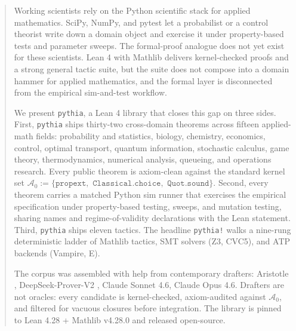 \begin{abstract}
Working scientists rely on the Python scientific stack for
applied mathematics. SciPy, NumPy, and pytest let a probabilist
or a control theorist write down a domain object and exercise it
under property-based tests and parameter sweeps. The formal-proof
analogue does not yet exist for these scientists. Lean 4 with
Mathlib delivers kernel-checked proofs and a strong general
tactic suite, but the suite does not compose into a domain
hammer for applied mathematics, and the formal layer is
disconnected from the empirical sim-and-test workflow.

We present \texttt{pythia}, a Lean 4 library that closes this
gap on three sides. First, \texttt{pythia} ships thirty-two
cross-domain theorems across fifteen applied-math fields:
probability and statistics, biology, chemistry, economics,
control, optimal transport, quantum information, stochastic
calculus, game theory, thermodynamics, numerical analysis,
queueing, and operations research. Every public theorem is
axiom-clean against the standard kernel set $\mathcal{A}_0 :=
\{\texttt{propext},$ $\texttt{Classical.choice},$
$\texttt{Quot.sound}\}$. Second, every theorem carries a matched
Python sim runner that exercises the empirical specification
under property-based testing, sweeps, and mutation testing,
sharing names and regime-of-validity declarations with the Lean
statement. Third, \texttt{pythia} ships eleven tactics. The
headline \texttt{pythia!} walks a nine-rung deterministic ladder
of Mathlib tactics, SMT solvers (Z3, CVC5), and ATP backends
(Vampire, E).

The corpus was assembled with help from contemporary drafters:
Aristotle \citep{harmonic2025aristotle}, DeepSeek-Prover-V2
\citep{deepseekprover2024v2}, Claude Sonnet 4.6, Claude Opus
4.6. Drafters are not oracles: every candidate is kernel-checked,
axiom-audited against $\mathcal{A}_0$, and filtered for vacuous
closures before integration. The library is pinned to Lean 4.28
+ Mathlib v4.28.0 and released open-source.
\end{abstract}
